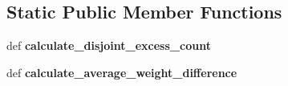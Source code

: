 \subsection*{Static Public Member Functions}
\begin{DoxyCompactItemize}
\item 
def {\bfseries calculate\+\_\+disjoint\+\_\+excess\+\_\+count}\hypertarget{class_n_e_a_t___py_genetics_1_1_n_e_a_t_1_1_analyst_1_1_genome_clusterer_1_1_genome_clusterer_a25f21d57d135bbf3b0f23bbfdef375e7}{}\label{class_n_e_a_t___py_genetics_1_1_n_e_a_t_1_1_analyst_1_1_genome_clusterer_1_1_genome_clusterer_a25f21d57d135bbf3b0f23bbfdef375e7}

\item 
def {\bfseries calculate\+\_\+average\+\_\+weight\+\_\+difference}\hypertarget{class_n_e_a_t___py_genetics_1_1_n_e_a_t_1_1_analyst_1_1_genome_clusterer_1_1_genome_clusterer_a748db217e8ce0c9f3e4302b00b4677e8}{}\label{class_n_e_a_t___py_genetics_1_1_n_e_a_t_1_1_analyst_1_1_genome_clusterer_1_1_genome_clusterer_a748db217e8ce0c9f3e4302b00b4677e8}

\end{DoxyCompactItemize}
